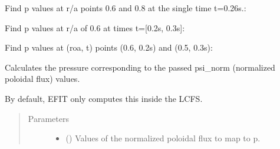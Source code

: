 \documentclass[letterpaper,10pt,english]{sphinxmanual}
\begin{document}
\begin{fulllineitems}
\begin{fulllineitems}
Find p values at r/a points 0.6 and 0.8 at the
single time t=0.26s.:

\begin{sphinxVerbatim}[commandchars=\\\{\}]
  \PYG{p}{[} \PYG{p}{]} 
\end{sphinxVerbatim}

Find p values at r/a of 0.6 at times t={[}0.2s, 0.3s{]}:

\begin{sphinxVerbatim}[commandchars=\\\{\}]
   \PYG{p}{[} \PYG{p}{]}
\end{sphinxVerbatim}

Find p values at (roa, t) points (0.6, 0.2s) and (0.5, 0.3s):

\begin{sphinxVerbatim}[commandchars=\\\{\}]
  \PYG{p}{[} \PYG{p}{]} \PYG{p}{[} \PYG{p}{]} 
\end{sphinxVerbatim}

\end{fulllineitems}


\begin{fulllineitems}
\label{\detokenize{eqtools:eqtools.core.Equilibrium.psinorm2p}}
Calculates the pressure corresponding to the passed psi\_norm (normalized poloidal flux) values.

By default, EFIT only computes this inside the LCFS.
\begin{quote}\begin{description}
\item[{Parameters}] \leavevmode\begin{itemize}
\item {} 
 () \textendash{} Values of the normalized
poloidal flux to map to p.


\end{itemize}
\end{description}
\end{quote}
\end{fulllineitems}
\end{fulllineitems}
\end{document}
